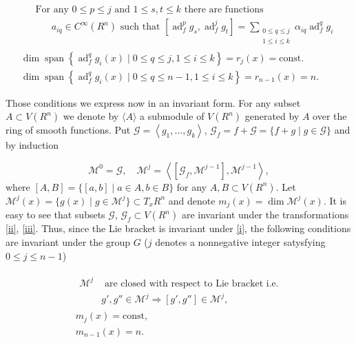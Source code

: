\documentclass[leqno]{article}
\theoremstyle{plain}
\numberwithin{equation}{section}
\newcommand{\ad}{\operatorname{ad}}
\begin{document}
\begin{gather}
	\label{A1}\tag{A1} 
	\begin{split}
		& \text { For any } 0 \leqslant p \leqslant j \text { and } 1 \leqslant s, t \leqslant k \text { there are functions } \\
		& \qquad a_{i q} \in C^{\infty}\left(R^{n}\right) \text { such that }\left[\ad_{f}^{p} g_{s}, \ad_{f}^{j} g_{t}\right]=\sum_{\substack{0 \leqslant q \leqslant j \\
				1 \leqslant i \leqslant k}} \alpha_{i q} \ad_{f}^{q} g_{i}
	\end{split}
	\\
	\label{A2}\tag{A2} 
	\operatorname{dim} \operatorname{span}\left\{\ad_{f}^{q} g_{i}(x) \mid 0 \leqslant q \leqslant j, 1 \leqslant i \leqslant k\right\}=r_{j}(x)=\text {const.}
	\\
	\operatorname{dim} \operatorname{span}\left\{\ad_{f}^{q} g_{i}(x) \mid 0 \leqslant q \leqslant n-1,1 \leqslant i \leqslant k\right\}=r_{n-1}(x)=n.
	\label{A3}\tag{A3}
\end{gather}

Those conditions we express now in an invariant form. For any subset $A \subset V\left(R^{n}\right)$ we denote by $\langle A\rangle$ a submodule of $V\left(R^{n}\right)$ generated by $A$ over the ring of smooth functions. Put $\mathscr{G}=\left\langle g_{1}, \ldots, g_{k}\right\rangle$, $\mathscr{G}_{f}=f+\mathscr{G}=\{f+g \mid g \in \mathscr{G}\}$ and by induction

\begin{equation*}
	\mathscr{M}^{0}=\mathscr{G}, \quad 
	\mathscr{M}^{j}=\left\langle\left[\mathscr{G}_{f}, \mathscr{M}^{j-1}\right], \mathscr{M}^{j-1}\right\rangle,
\end{equation*}
where $[A, B]=\{[a, b] \mid a \in A, b \in B\}$ for any $A, B \subset V\left(R^{n}\right)$. Let $\mathscr{M}^{j}(x)=\{g(x) \mid g \in \mathscr{M}^{j}\} \subset T_{x} R^{n}$ and denote $m_{j}(x)=\operatorname{dim} \mathscr{M}^{j}(x)$. 
It is easy to see that subsets $\mathscr{G}$, $\mathscr{G}_{f} \subset V\left(R^{n}\right)$ are invariant under the transformations \eqref{ii}, \eqref{iii}. 
Thus, since the Lie bracket is invariant under \eqref{i}, the following conditions are invariant under the group $G$ ($j$ denotes a nonnegative integer satysfying $0 \leqslant j \leqslant n-1$)

\begin{gather}
	\label{B1} \tag{B1}
	\begin{split}
		\mathscr{M}^{j} & \text{ are closed with respect to Lie bracket i.e.}  \\
		& g', g'' \in \mathscr{M}^{j} \Rightarrow\left[g', g''\right] \in \mathscr{M}^{j},
	\end{split}
	\\
	\label{B2} \tag{B2}
	m_{j}(x)=\mathrm{const},
	\\
	\label{B3} \tag{B3}
	m_{n-1}(x)=n.
\end{gather}
\end{document}
